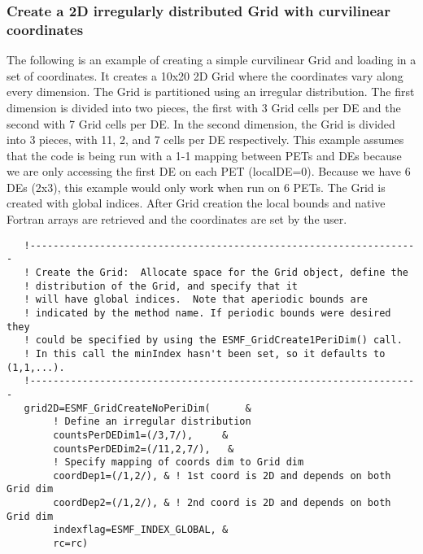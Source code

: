   
  \subsubsection{Create a 2D irregularly distributed Grid
                    with curvilinear coordinates}
   \label{example:2DIrregCurviGrid}
  
   The following is an example of creating a simple curvilinear Grid and
   loading in a set of coordinates. It creates a 10x20
   2D Grid where the coordinates vary along every dimension.
   The Grid is partitioned using an irregular distribution. The first dimension
   is divided into two pieces, the first with 3 Grid cells per
   DE and the second with 7 Grid cells per DE. In the second dimension,
   the Grid is divided into 3 pieces, with 11, 2, and 7 cells per DE respectively.
   This example assumes that the code is being run with a 1-1 mapping between
   PETs and DEs because we are only accessing the first DE on each PET (localDE=0).
   Because we have 6 DEs (2x3), this example would only work when run on 6 PETs.
   The Grid is created with global indices. After Grid creation the
   local bounds and native Fortran arrays are retrieved and the
   coordinates are set by the user.
   

 \begin{verbatim}
   !-------------------------------------------------------------------
   ! Create the Grid:  Allocate space for the Grid object, define the
   ! distribution of the Grid, and specify that it
   ! will have global indices.  Note that aperiodic bounds are
   ! indicated by the method name. If periodic bounds were desired they
   ! could be specified by using the ESMF_GridCreate1PeriDim() call.
   ! In this call the minIndex hasn't been set, so it defaults to (1,1,...).
   !-------------------------------------------------------------------
   grid2D=ESMF_GridCreateNoPeriDim(      &
        ! Define an irregular distribution
        countsPerDEDim1=(/3,7/),     &
        countsPerDEDim2=(/11,2,7/),   &
        ! Specify mapping of coords dim to Grid dim
        coordDep1=(/1,2/), & ! 1st coord is 2D and depends on both Grid dim
        coordDep2=(/1,2/), & ! 2nd coord is 2D and depends on both Grid dim
        indexflag=ESMF_INDEX_GLOBAL, &
        rc=rc)
 
\end{verbatim}
 

